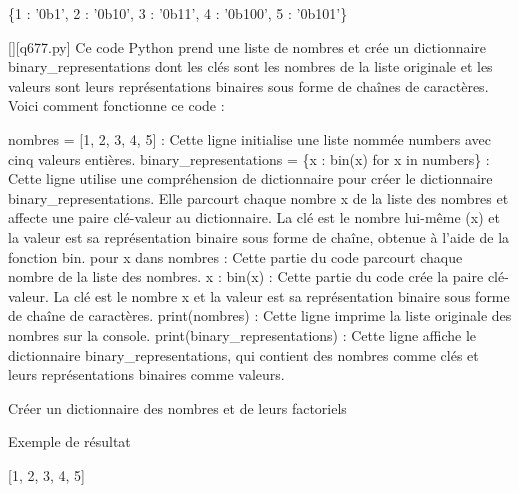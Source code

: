 \{1 : '0b1', 2 : '0b10', 3 : '0b11', 4 : '0b100', 5 : '0b101'\}
        \par
        \begin{solution}
            \renewcommand{\nomfichier}{q677.py}
            \pythonfile{\chemincode \nomfichier}[][\nomfichier]
            Ce code Python prend une liste de nombres et crée un dictionnaire binary\_representations dont les clés sont les nombres de la liste originale et les valeurs sont leurs représentations binaires sous forme de chaînes de caractères. Voici comment fonctionne ce code :

    nombres = [1, 2, 3, 4, 5] : Cette ligne initialise une liste nommée numbers avec cinq valeurs entières.
    binary\_representations = \{x : bin(x) for x in numbers\} : Cette ligne utilise une compréhension de dictionnaire pour créer le dictionnaire binary\_representations. Elle parcourt chaque nombre x de la liste des nombres et affecte une paire clé-valeur au dictionnaire. La clé est le nombre lui-même (x) et la valeur est sa représentation binaire sous forme de chaîne, obtenue à l'aide de la fonction bin.
        pour x dans nombres : Cette partie du code parcourt chaque nombre de la liste des nombres.
        x : bin(x) : Cette partie du code crée la paire clé-valeur. La clé est le nombre x et la valeur est sa représentation binaire sous forme de chaîne de caractères.
    print(nombres) : Cette ligne imprime la liste originale des nombres sur la console.
    print(binary\_representations) : Cette ligne affiche le dictionnaire binary\_representations, qui contient des nombres comme clés et leurs représentations binaires comme valeurs.
        \end{solution}
        

        \question
        Créer un dictionnaire des nombres et de leurs factoriels

Exemple de résultat

[1, 2, 3, 4, 5]

